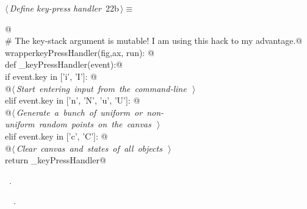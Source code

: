 \documentclass[11.5pt]{report}
\begin{document}
\begin{flushleft} \small
\begin{minipage}{\linewidth}\label{scrap16}\raggedright\small
{} $\langle\,${\itshape Define key-press handler}\nobreak\ {\footnotesize {22b}}$\,\rangle\equiv$
\vspace{-1ex}
\begin{list}{}{} \item
\mbox{}\verb@   @\\
\mbox{}\verb@# The key-stack argument is mutable! I am using this hack to my advantage.@\\
\mbox{}\verb@def wrapperkeyPressHandler(fig,ax, run): @\\
\mbox{}\verb@       def _keyPressHandler(event):@\\
\mbox{}\verb@           if event.key in ['i', 'I']:  @\\
\mbox{}\verb@                @\hbox{$\langle\,${\itshape Start entering input from the command-line}\nobreak\ {\footnotesize {}}$\,\rangle$}\verb@@\\
\mbox{}\verb@           elif event.key in ['n', 'N', 'u', 'U']: @\\
\mbox{}\verb@                @\hbox{$\langle\,${\itshape Generate a bunch of uniform or non-uniform random points on the canvas}\nobreak\ {\footnotesize {}}$\,\rangle$}\verb@@\\
\mbox{}\verb@           elif event.key in ['c', 'C']: @\\
\mbox{}\verb@                @\hbox{$\langle\,${\itshape Clear canvas and states of all objects}\nobreak\ {\footnotesize {}}$\,\rangle$}\verb@@\\
\mbox{}\verb@       return _keyPressHandler@\\
\mbox{}\verb@@{\NWsep}
\end{list}
\vspace{-1.5ex}
\footnotesize
\begin{list}{}{\setlength{\itemsep}{-\parsep}\setlength{\itemindent}{-\leftmargin}}
\item \NWtxtMacroRefIn\ .
\item \NWtxtIdentsDefed\nobreak\  \verb@wrapperkeyPressHandler@\nobreak\ .
\item{}
\end{list}
\end{minipage}\vspace{4ex}
\end{flushleft}
\end{document}
